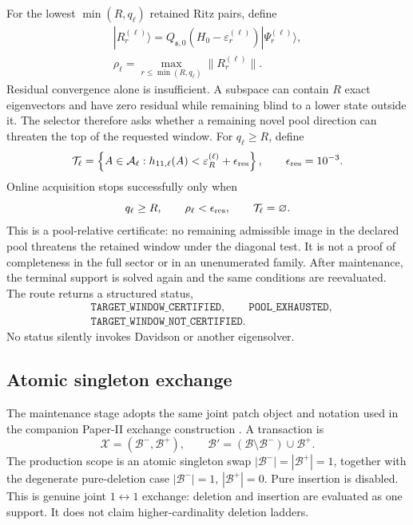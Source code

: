 \documentclass[
  reprint,
  amsmath,
  amssymb,
  aps,
  pra,
  nofootinbib,
  superscriptaddress,
  floatfix
]{revtex4-2}
\newcommand{\ket}[1]{|#1\rangle}
\begin{document}
For the lowest $\min(R,q_\ell)$ retained Ritz pairs, define
\begin{align}
 \ket{R_r^{(\ell)}}=
 Q_{\mathfrak s,0}(H_0-\varepsilon_r^{(\ell)})
 \ket{\Psi_r^{(\ell)}},
 \nonumber\\
 \rho_\ell=\max_{r\leq\min(R,q_\ell)}\|R_r^{(\ell)}\|.
 \label{eq:target_residual}
\end{align}
Residual convergence alone is insufficient.  A subspace can contain $R$
exact eigenvectors and have zero residual while remaining blind to a lower
state outside it.  The selector therefore asks whether a remaining novel
pool direction can threaten the top of the requested window.  For
$q_\ell\geq R$, define
\begin{equation}
 \mathcal T_\ell=\left\{
 A\in\mathcal A_\ell:
 h_{11,\ell}(A)<\varepsilon_R^{(\ell)}+\epsilon_{\rm res}
 \right\},
 \qquad \epsilon_{\rm res}=10^{-3}.
 \label{eq:window_pressure_set}
\end{equation}
Online acquisition stops successfully only when
\begin{equation}
 q_\ell\geq R,
 \qquad \rho_\ell<\epsilon_{\rm res},
 \qquad \mathcal T_\ell=\varnothing.
 \label{eq:online_stop}
\end{equation}
This is a pool-relative certificate: no remaining admissible image in the
declared pool threatens the retained window under the diagonal test.  It is
not a proof of completeness in the full sector or in an unenumerated family.
After maintenance, the terminal support is solved again and the same
conditions are reevaluated.  The route returns a structured status,
\begin{equation}
 \begin{aligned}
 &\texttt{TARGET\_WINDOW\_CERTIFIED},\qquad
  \texttt{POOL\_EXHAUSTED},\\
 &\texttt{TARGET\_WINDOW\_NOT\_CERTIFIED}.
 \end{aligned}
 \label{eq:terminal_statuses}
\end{equation}
No status silently invokes Davidson or another eigensolver.

\subsection{Atomic singleton exchange}
\label{sec:atomic_exchange}

The maintenance stage adopts the same joint patch object and notation used in
the companion Paper-II exchange construction \cite{PaperII}.  A transaction is
\begin{equation}
 \mathcal X=(\mathcal B^-,\mathcal B^+),
 \qquad
 \mathcal B'=(\mathcal B\setminus\mathcal B^-)\cup\mathcal B^+.
 \label{eq:exchange_patch}
\end{equation}
The production scope is an atomic singleton swap
$|\mathcal B^-|=|\mathcal B^+|=1$, together with the degenerate pure-deletion
case $|\mathcal B^-|=1$, $|\mathcal B^+|=0$.  Pure insertion is disabled.
This is genuine joint $1\leftrightarrow1$ exchange: deletion and insertion are
evaluated as one support.  It does not claim higher-cardinality deletion
ladders.
\end{document}
